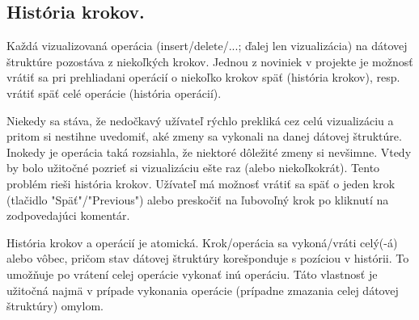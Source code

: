 \subsection{História krokov.}
Každá vizualizovaná operácia (insert/delete/...; ďalej len vizualizácia) na 
dátovej štruktúre pozostáva
z niekoľkých krokov. Jednou z noviniek v projekte je možnosť vrátiť sa pri
prehliadani operácií o niekoľko krokov späť (história krokov), resp. vrátiť späť
celé operácie (história operácií).

Niekedy sa stáva, že nedočkavý užívateľ rýchlo prekliká cez celú vizualizáciu a pritom si nestihne uvedomiť, aké zmeny sa vykonali na danej dátovej
štruktúre. Inokedy je operácia taká rozsiahla, že niektoré dôležité zmeny si
nevšimne. Vtedy by bolo užitočné pozrieť si vizualizáciu ešte raz (alebo
niekoľkokrát). Tento problém rieši história krokov. Užívateľ má možnosť vrátiť
sa späť o jeden krok (tlačidlo "Späť"/"Previous") alebo preskočiť na ľubovoľný
krok po kliknutí na zodpovedajúci komentár.

História krokov a operácií je atomická. Krok/operácia sa vykoná/vráti celý(-á)
alebo vôbec, pričom stav dátovej štruktúry korešponduje s pozíciou v histórii.
To umožňuje po vrátení celej operácie vykonať inú operáciu. Táto vlastnosť je
užitočná najmä v prípade vykonania operácie (prípadne zmazania celej dátovej
štruktúry) omylom.

